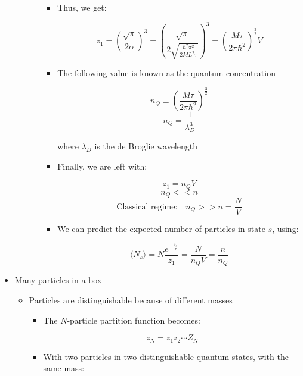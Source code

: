 \begin{itemize}
\begin{itemize}
\begin{itemize}
\begin{itemize}
              \item Thus, we get:

                $$z_1=\left(  \frac{\sqrt{\pi}}{2\alpha}\right)^3=\left( \frac{\sqrt{\pi}}{2\sqrt{\frac{\hbar^2\pi^2}{2ML^2\tau}}} \right)^3=\left(\frac{M\tau}{2\pi\hbar^2}\right)^\frac{3}{2}V$$

              \item The following value is known as the quantum concentration

                $$n_Q\equiv\left( \frac{M\tau}{2\pi\hbar^2} \right)^{\frac{3}{2}}$$
                $$n_Q=\frac{1}{\lambda_D^3}$$

                where $\lambda_D$ is the de Broglie wavelength

              \item Finally, we are left with:

                $$z_1=n_QV$$
                $$n_Q<<n$$
                $$\text{Classical regime:}\quad n_Q>>n=\frac{N}{V}$$

              \item We can predict the expected number of particles in state $s$, using:

                $$\langle N_s\rangle=N\frac{e^{-\frac{\varepsilon_s}{\tau}}}{z_1}=\frac{N}{n_QV}=\frac{n}{n_Q}$$

            \end{itemize}

        \end{itemize}

    \end{itemize}

  \item Many particles in a box

    \begin{itemize}

      \item Particles are distinguishable because of different masses

        \begin{itemize}

          \item The $N$-particle partition function becomes:

            $$z_N=z_1z_2\cdots Z_N$$

          \item With two particles in two distinguishable quantum states, with the same mass:

            \begin{itemize}


\end{itemize}
\end{itemize}
\end{itemize}
\end{itemize}
